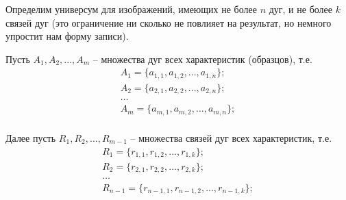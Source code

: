 Определим универсум для изображений, имеющих не более $n$ дуг, и не более $k$ связей дуг (это ограничение ни сколько не повлияет на результат, но немного упростит нам форму записи).

Пусть $A_1, A_2, ..., A_m$ – множества дуг всех характеристик (образцов), т.е.
\begin{equation}
\begin{array}{c}
A_1 = \{a_{1,1}, a_{1,2}, ..., a_{1,n}\}; \\
A_2 = \{ a_{2,1}, a_{2,2}, ..., a_{2,n}\}; \\
\dots \\
A_m = \{ a_{m,1}, a_{m,2}, ..., a_{m,n}\}; \\
\end{array}
\end{equation}

Далее пусть $R_1, R_2, ..., R_{m-1}$ – множества связей дуг всех характеристик, т.е. 
\begin{equation}
\begin{array}{c}
R_1 = \{r_{1,1}, r_{1,2}, ..., r_{1,k}\}; \\
R_2 = \{ r_{2,1}, r_{2,2}, ..., r_{2,k}\}; \\
\dots \\
R_{n-1} = \{ r_{{n-1},1}, r_{{n-1},2}, ..., r_{{n-1},k}\}; \\
\end{array}
\end{equation}

